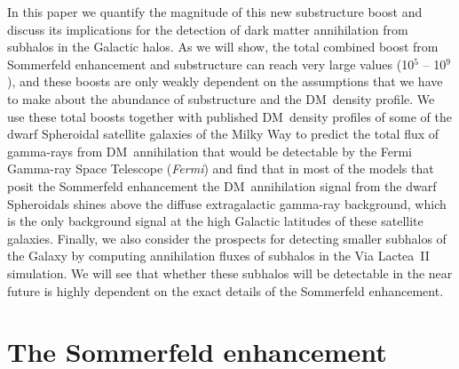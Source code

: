 \documentclass[aps,prd,twocolumn,amsmath,amssymb,floatfix,nofootinbib,10pt]{revtex4}
\newcommand{\Fermi}{\emph{Fermi}}
\newcommand{\VL}{Via Lactea}
\newcommand{\DM}{DM}
\begin{document}
In this paper we quantify the magnitude of this new substructure boost
and discuss its implications for the detection of dark matter
annihilation from subhalos in the Galactic halos. As we will show, the
total combined boost from Sommerfeld enhancement and substructure can
reach very large values (10$^5$ -- 10$^9$), and these boosts are only
weakly dependent on the assumptions that we have to make about the
abundance of substructure and the \DM\ density profile. We use these
total boosts together with published \DM\ density profiles of some of
the dwarf Spheroidal satellite galaxies of the Milky Way to predict
the total flux of gamma-rays from \DM\ annihilation that would be
detectable by the Fermi Gamma-ray Space Telescope (\Fermi) and find
that in most of the models that posit the Sommerfeld enhancement the
\DM\ annihilation signal from the dwarf Spheroidals shines above the
diffuse extragalactic gamma-ray background, which is the only
background signal at the high Galactic latitudes of these satellite
galaxies. Finally, we also consider the prospects for detecting
smaller subhalos of the Galaxy by computing annihilation fluxes of
subhalos in the \VL\ II simulation. We will see that whether these
subhalos will be detectable in the near future is highly dependent on
the exact details of the Sommerfeld enhancement.




\section{The Sommerfeld enhancement}
\end{document}
